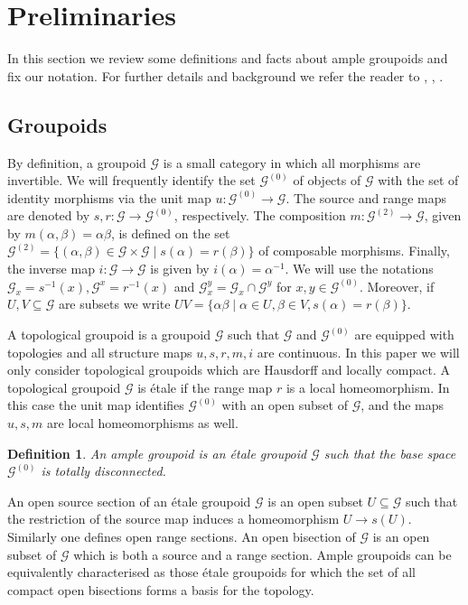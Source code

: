 \documentclass{amsart}
\newtheorem{dfn}[thm]{Definition}
\newcommand{\G}{\mathcal{G}}
\begin{document}
\section{Preliminaries} \label{section:preliminaries}

In this section we review some definitions and facts about ample groupoids and fix our notation. For further details and background we refer the reader to \cite{PATERSON_groupoidsinversesemigroups}, \cite{RENAULT_groupoidapproach}, \cite{TU_nonhausdorffgroupoids}.  

\subsection{Groupoids}

By definition, a groupoid $ \G $ is a small category in which all morphisms are invertible. We will frequently identify the set $ \G^{(0)} $ of objects of $ \G $ with the set of identity morphisms via the unit map $ u: \G^{(0)} \rightarrow \G $. The source and range maps are denoted by $ s,r: \G \rightarrow \G^{(0)} $, respectively. The 
composition $ m: \G^{(2)} \rightarrow \G $, given by $ m(\alpha, \beta) = \alpha \beta $, is defined on the 
set $ \G^{(2)} = \{(\alpha, \beta) \in \G \times \G \mid s(\alpha) = r(\beta) \} $ of composable morphisms. Finally, the inverse map $ i: \G \rightarrow \G $ is given by $ i(\alpha) = \alpha^{-1} $. We will use the notations $ \G_x = s^{-1}(x), \G^x = r^{-1}(x) $ and $ \G^y_x = \G_x \cap \G^y $ for $ x, y \in \G^{(0)} $. Moreover, if $ U, V \subseteq \G $ are subsets we write $ UV = \{\alpha \beta \mid \alpha \in U, \beta \in V, s(\alpha) = r(\beta) \} $. 

A topological groupoid is a groupoid $ \G $ such that $ \G $ and $ \G^{(0)} $ are equipped with topologies and all structure maps $ u,s,r,m,i $ are continuous. In this paper we will only consider topological groupoids which are Hausdorff and locally compact. A topological groupoid $ \G $ is \'etale if the range map $ r $ is a local homeomorphism. In this case
the unit map identifies $ \G^{(0)} $ with an open subset of $ \G $, and the maps $ u, s, m $ are local homeomorphisms as well. 

\begin{dfn}
An ample groupoid is an \'etale groupoid $ \G $ such that the base space $ \G^{(0)} $ is totally disconnected. 
\end{dfn}

An open source section of an \'etale groupoid $ \G $ is an open subset $ U \subseteq \G $ such that the restriction of the source map induces a homeomorphism $ U \rightarrow s(U) $. 
Similarly one defines open range sections. An open bisection of $ \G $ is an open subset of $ \G $ which is both a source and a range section. Ample groupoids can be equivalently characterised as those \'etale groupoids for which the set of all compact open bisections forms a basis for the topology. 
\end{document}
